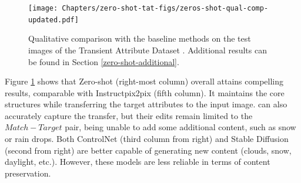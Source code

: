  \begin{figure}[ht]
  \texttt{[image: Chapters/zero-shot-tat-figs/zeros-shot-qual-comp-updated.pdf]}
  \caption{Qualitative comparison with the baseline methods on the test images of the Transient Attribute Dataset \cite{laffont2014transient}. Additional results can be found in Section \ref{zero-shot-additional}.}
  \label{fig:zero-shot-comparison}
\end{figure}

Figure \ref{fig:zero-shot-comparison} shows that Zero-shot (right-most column) overall attains compelling results, comparable with Instructpix2pix (fifth column). It maintains the core structures while transferring the target attributes to the input image. \citeauthor{laffont2014transient} \cite{laffont2014transient} can also accurately capture the transfer, but their edits remain limited to the $Match - Target$ pair, being unable to add some additional content, such as snow or rain drops. Both ControlNet (third column from right) and Stable Diffusion (second from right) are better capable of generating new content (clouds, snow, daylight, etc.). However, these models are less reliable in terms of content preservation. 

